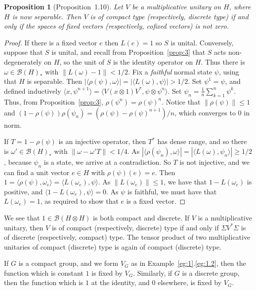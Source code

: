 \documentclass[a4paper,12pt]{article}
\theoremstyle{plain}
\newtheorem{proposition}{Proposition}[section]
\theoremstyle{definition}
\newcommand{\ip}[2]{{\langle {#1} , {#2} \rangle}}
\newcommand{\mc}{\mathcal}
\begin{document}
\begin{proposition}[Proposition~1.10]\label{prop:4}
Let $V$ be a multiplicative unitary on $H$, where $H$ is now separable.
Then $V$ is of compact type (respectively, discrete type) if and only if
the spaces of fixed vectors (respectively, cofixed vectors) is not zero.
\end{proposition}
\begin{proof}
If there is a fixed vector $e$ then $L(e)=1$ so $S$ is unital.  Conversely,
suppose that $S$ is unital, and recall from Proposition~\ref{prop:3} that
$S$ acts non-degenerately on $H$, so the unit of $S$ is the identity operator
on $H$.  Thus there is $\omega\in\mc B(H)_*$ with $\|L(\omega)-1\|<1/2$.
Fix a \emph{faithful} normal state $\psi$, using that $H$ is separable.
Then $|\ip{\rho(\psi)}{\omega}| = |\ip{L(\omega)}{\psi}| > 1/2$.
Set $\psi^1=\psi$, and defined inductively
$\ip{x}{\psi^{n+1}} = \ip{V(x\otimes 1)V^*}{\psi\otimes\psi^n}$.
Set $\psi_n = \frac1n \sum_{k=1}^n \psi^k$.
Thus, from Proposition~\ref{prop:3}, $\rho(\psi^n)=\rho(\psi)^n$.
Notice that $\|\rho(\psi)\|\leq 1$ and $(1-\rho(\psi))\rho(\psi_n) =
(\rho(\psi) - \rho(\psi)^{n+1})/n$, which converges to $0$ in norm.

If $T=1-\rho(\psi)$ is an injective operator, then $T^*$ has dense range,
and so there is $\omega'\in\mc B(H)_*$ with $\|\omega - \omega'T\|<1/4$.
As $|\ip{\rho(\psi_n)}{\omega}| = |\ip{L(\omega)}{\psi_n}|\geq 1/2$, because
$\psi_n$ is a state, we arrive at a contradiction.
So $T$ is not injective, and we can find a unit vector $e\in H$ with
$\rho(\psi)(e)=e$.  Then $1 = \ip{\rho(\psi)}{\omega_e}
= \ip{L(\omega_e)}{\psi}$.  As $\|L(\omega_e)\|\leq 1$, we have that
$1-L(\omega_e)$ is positive, and $\ip{1-L(\omega_e)}{\psi}=0$.
As $\psi$ is faithful, we must have that $L(\omega_e)=1$, as required to show
that $e$ is a fixed vector.
\end{proof}

We see that $1\in\mc B(H\otimes H)$ is both compact and discrete.
If $V$ is a multiplicative unitary, then $V$ is of compact (respectively,
discrete) type if and only if $\Sigma V^*\Sigma$ is of discrete (respectively,
compact) type.  The tensor product of two multiplicative unitaries of compact
(discrete) type is again of compact (discrete) type.

If $G$ is a compact group, and we form $V_G$ as in
Example~\ref{eg:1}.\ref{eg:1.2}, then the function which is constant $1$ is
fixed by $V_G$.  Similarly, if $G$ is a discrete group, then the function
which is $1$ at the identity, and $0$ elsewhere, is fixed by $V_G$.
\end{document}
